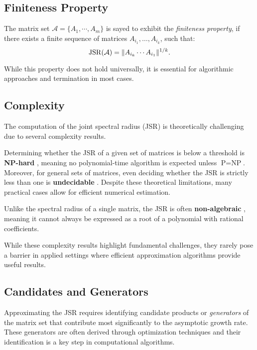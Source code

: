 \subsection*{Finiteness Property}
\begin{definition}
    The matrix set $\mathcal{A} = \{ A_1, \cdots, A_m\}$ is sayed to exhibit the \emph{finiteness property}, if there exists a finite sequence of matrices $A_{i_1}, \dots, A_{i_k}$, such that:
    \begin{equation}
    \operatorname{JSR}(\mathcal{A}) = \|A_{i_k} \cdots A_{i_1}\|^{1/k}.
    \end{equation}
\end{definition}
While this property does not hold universally, it is essential for algorithmic approaches and termination in most cases.

\subsection*{Complexity}

The computation of the joint spectral radius (JSR) is theoretically challenging due to several complexity results.

Determining whether the JSR of a given set of matrices is below a threshold is \textbf{NP-hard} \citep{tsitsiklis1997lyapunov}, meaning no polynomial-time algorithm is expected unless $\text{P} = \text{NP}$. Moreover, for general sets of matrices, even deciding whether the JSR is strictly less than one is \textbf{undecidable} \citep{blondel2000boundedness}. Despite these theoretical limitations, many practical cases allow for efficient numerical estimation.

Unlike the spectral radius of a single matrix, the JSR is often \textbf{non-algebraic} \citep{guglielmiExactComputationJoint2011}, meaning it cannot always be expressed as a root of a polynomial with rational coefficients.

While these complexity results highlight fundamental challenges, they rarely pose a barrier in applied settings where efficient approximation algorithms provide useful results.

\subsection*{Candidates and Generators}
Approximating the JSR requires identifying candidate products or \emph{generators} of the matrix set that contribute most significantly to the asymptotic growth rate. These generators are often derived through optimization techniques and their identification is a key step in computational algorithms.

